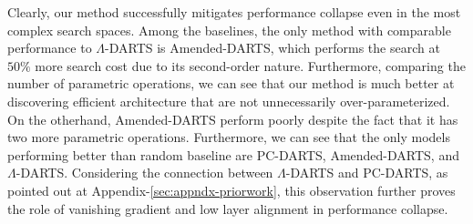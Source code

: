 \documentclass{article} \usepackage{fancyhdr, iclr2023_conference, times}
\newcommand{\mydarts}{$\Lambda$-DARTS\xspace}
\newcommand{\lambdafn}{layer alignment\xspace}
\begin{document}
\par Clearly, our method successfully mitigates performance collapse even in the most complex search spaces. Among the baselines, the only method with comparable performance to \mydarts is Amended-DARTS, which performs the search at $50\%$ more search cost due to its second-order nature. Furthermore, comparing the number of parametric operations, we can see that our method is much better at discovering efficient architecture that are not unnecessarily over-parameterized. On the otherhand, Amended-DARTS perform poorly despite the fact that it has two more parametric operations. Furthermore, we can see that the only models performing better than random baseline are PC-DARTS, Amended-DARTS, and \mydarts. Considering the connection between \mydarts and PC-DARTS, as pointed out at Appendix-\ref{sec:appndx-priorwork}, this observation further proves the role of vanishing gradient and low \lambdafn in performance collapse.
\end{document}
